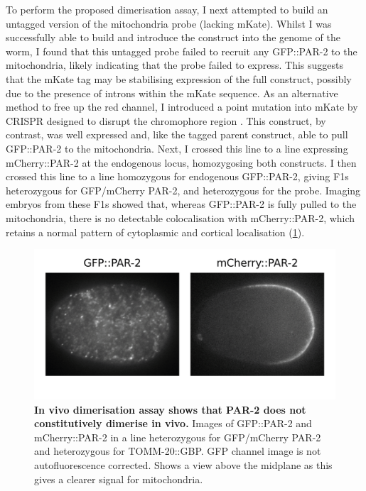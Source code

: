 \documentclass[12pt]{"article"}
\newcommand{\mycaption}[2]{\caption[#1]{\textbf{#1.} #2}}
\begin{document}
To perform the proposed dimerisation assay, I next attempted to build an untagged version of the mitochondria probe (lacking mKate). Whilst I was successfully able to build and introduce the construct into the genome of the worm, I found that this untagged probe failed to recruit any GFP::PAR-2 to the mitochondria, likely indicating that the probe failed to express. This suggests that the mKate tag may be stabilising expression of the full construct, possibly due to the presence of introns within the mKate sequence. As an alternative method to free up the red channel, I introduced a point mutation into mKate by CRISPR designed to disrupt the chromophore region \citep{Pletnev2008}. This construct, by contrast, was well expressed and, like the tagged parent construct, able to pull GFP::PAR-2 to the mitochondria. Next, I crossed this line to a line expressing mCherry::PAR-2 at the endogenous locus, homozygosing both constructs. I then crossed this line to a line homozygous for endogenous GFP::PAR-2, giving F1s heterozygous for GFP/mCherry PAR-2, and heterozygous for the probe.  Imaging embryos from these F1s showed that, whereas GFP::PAR-2 is fully pulled to the mitochondria, there is no detectable colocalisation with mCherry::PAR-2, which retains a normal pattern of cytoplasmic and cortical localisation (\cref{fig:tomm20_assay}).\\

\begin{figure}
\includegraphics[scale=1]{tomm20_assay}
\centering
\mycaption{In vivo dimerisation assay shows that PAR-2 does not constitutively dimerise in vivo}{
Images of GFP::PAR-2 and mCherry::PAR-2 in a line heterozygous for GFP/mCherry PAR-2 and heterozygous for TOMM-20::GBP. GFP channel image is not autofluorescence corrected. Shows a view above the midplane as this gives a clearer signal for mitochondria.
}
\label{fig:tomm20_assay}
\end{figure}
\end{document}
